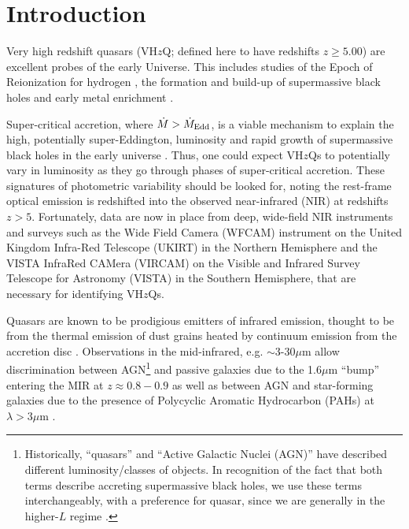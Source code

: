 \documentclass[usenatbib]{mnras}
\begin{document}
\section{Introduction}
Very high redshift quasars (VH$z$Q; defined here to have redshifts $z\geq5.00$) are excellent probes of the early Universe. This includes studies of the Epoch of Reionization for hydrogen \citep[see e.g.][for reviews]{Fan2006review, Mortlock2016}, the formation and build-up of supermassive black holes \citep[e.g., ][]{Rees1984, WyitheLoeb2003, Volonteri2010, Agarwal2016, Valiante2018, Latif2018, Wise2019} and early metal enrichment \citep[see e.g., ][]{Simcoe2012, Chen2017, Bosman2017}.

Super-critical accretion, where $\dot{M} > \dot{M}_{\rm Edd}$, is a viable mechanism to explain the high, potentially super-Eddington, luminosity and rapid growth of supermassive black holes in the early universe \citep[e.g.,][]{AlexanderNatarajan2014, MadauHaardtDotti2014, Volonteri2015, Pezzulli2016, Lupi2016, Pezzulli2017, Takeo2018}. Thus, one could expect VH$z$Qs to potentially vary in luminosity as they go through phases of super-critical accretion. These signatures of photometric variability should be looked for, noting the rest-frame optical emission is redshifted into the observed near-infrared (NIR) at redshifts $z>5$. Fortunately, data are now in place from deep, wide-field NIR instruments and surveys such as the Wide Field Camera (WFCAM) instrument on the United Kingdom Infra-Red Telescope (UKIRT) in the Northern Hemisphere and the VISTA InfraRed CAMera (VIRCAM) on the Visible and Infrared Survey Telescope for Astronomy (VISTA) in the Southern Hemisphere, that are necessary for identifying VH$z$Qs.

Quasars are known to be prodigious emitters of infrared emission, thought to be from the thermal emission of dust grains heated by continuum emission from the accretion disc \citep[e.g.,][]{Richards2006b, Leipski2014, Hill2014, Hickox2017}. Observations in the mid-infrared, e.g. $\sim$3-30$\mu$m allow discrimination between AGN\footnote{Historically, ``quasars'' and ``Active Galactic Nuclei (AGN)'' have described different
luminosity/classes of objects. In recognition of the fact that both terms describe accreting supermassive black holes, we use these terms interchangeably, with a preference for quasar, since we are generally in the higher-$L$ regime \citep[e.g.][]{Haardt2016book}.}  and passive galaxies due to the 1.6$\mu$m ``bump'' entering the MIR at $z\approx0.8-0.9$ \citep[e.g., ][]{Wright1994, Sawicki2002, Lacy2004, Stern2005, Richards2006b, Timlin2016} as well as between AGN and star-forming galaxies due to the presence of Polycyclic Aromatic Hydrocarbon (PAHs) at $\lambda
>3\mu$m \citep[e.g., ][]{Yan2007, Tielens2008}. 
\end{document}
